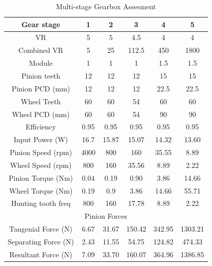 \documentclass[a4paper]{article}
\begin{document}
\begin{table}[H]
\caption{\label{MSG}Multi-stage Gearbox Assesment}
\centering
\begin{tabular}{||c|c|c|c|c|c||}
\hline
Gear stage & 1 & 2 & 3 & 4 & 5 \\ \hline\hline
VR & 5 & 5 & 4.5 & 4 & 4 \\ \hline
Combined VR & 5 & 25 & 112.5 & 450 & 1800 \\ \hline
Module & 1 & 1 & 1 & 1.5 & 1.5 \\ \hline
Pinion teeth & 12 & 12 & 12 & 15 & 15 \\ \hline
Pinion PCD (mm) & 12 & 12 & 12 & 22.5 & 22.5 \\ \hline
Wheel Teeth & 60 & 60 & 54 & 60 & 60 \\ \hline
Wheel PCD (mm) & 60 & 60 & 54 & 90 & 90 \\ \hline
Efficiency & 0.95 & 0.95 & 0.95 & 0.95 & 0.95 \\ \hline
Input Power (W) & 16.7 & 15.87 & 15.07 & 14.32 & 13.60 \\ \hline
Pinion Speed (rpm) & 4000 & 800 & 160 & 35.55 & 8.89 \\ \hline
Wheel Speed (rpm) & 800 & 160 & 35.56 & 8.89 & 2.22 \\ \hline
Pinion Torque (Nm) & 0.04 & 0.19 & 0.90 & 3.86 & 14.66 \\ \hline
Wheel Torque (Nm) & 0.19 & 0.9 & 3.86 & 14.66 & 55.71 \\ \hline
Hunting tooth freq & 800 & 160 & 17.78 & 8.89 & 2.22 \\ \hline\hline
\multicolumn{6}{||c||}{Pinion Forces} \\ \hline
Tangenial Force (N) & 6.67 & 31.67 & 150.42 & 342.95 & 1303.21 \\ \hline
Separating Force (N) & 2.43 & 11.55 & 54.75 & 124.82 & 474.33 \\ \hline
Resultant Force (N) & 7.09 & 33.70 & 160.07 & 364.96 & 1386.85 \\ \hline\hline
\end{tabular}
\end{table}
\end{document}
